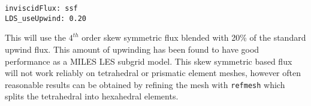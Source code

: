 \begin{verbatim}
inviscidFlux: ssf
LDS_useUpwind: 0.20
\end{verbatim}

This will use the $4^{th}$ order skew symmetric flux blended with 20\%
of the standard upwind flux.  This amount of upwinding has been found
to have good performance as a MILES LES subgrid model.  This skew
symmetric based flux will not work reliably on tetrahedral or
prismatic element meshes, however often reasonable results can be
obtained by refining the mesh with {\tt refmesh} which splits the
tetrahedral into hexahedral elements.


